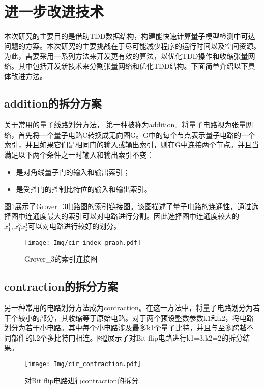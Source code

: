 \section{进一步改进技术}
本次研究的主要目的是借助TDD数据结构，构建能快速计算量子模型检测中可达问题的方案。本次研究的主要挑战在于尽可能减少程序的运行时间以及空间资源。为此，需要采用一系列方法来开发更有效的算法，以优化TDD操作和收缩张量网络。其中包括开发新技术来分割张量网络和优化TDD结构。下面简单介绍以下具体改进方法。

\subsection*{addition的拆分方案}
\label{addition}关于常用的量子线路划分方法，
第一种被称为addition\citep{chen2018classical}。将量子电路视为张量网络，首先将一个量子电路C转换成无向图G。G中的每个节点表示量子电路的一个索引，并且如果它们是相同门的输入或输出索引，则在G中连接两个节点。并且当满足以下两个条件之一时输入和输出索引不变：
\begin{itemize}
	\item 是对角线量子门的输入和输出索引；
	\item 是受控门的控制比特位的输入和输出索引。
\end{itemize}
	
图\ref{fig:addition}展示了Grover\_3电路图的索引链接图。该图描述了量子电路的连通性，通过选择图中连通度最大的索引可以对电路进行分割。因此选择图中连通度较大的$x_1^1,x_1^3x_2^1$可以对电路进行较好的划分。
 
\begin{figure}[!htbp]
	\centering
	\texttt{[image: Img/cir\_index\_graph.pdf]}
	\caption{Grover\_3的索引连接图}
	\label{fig:addition}
\end{figure} 

\subsection*{contraction的拆分方案}
另一种常用的电路划分方法成为contraction。在这一方法中，将量子电路划分为若干个较小的部分，其收缩等于原始电路。对于两个预设整数参数k1和k2，将电路划分为若干小电路。其中每个小电路涉及最多k1个量子比特，并且与至多跨越不同部件的k2个多比特门相连。图\ref{fig:contraction}展示了对Bit flip电路进行k1=3,k2=2的拆分结果。
\begin{figure}[!htbp]
	\centering
	\texttt{[image: Img/cir\_contraction.pdf]}
	\caption{对Bit flip电路进行contraction的拆分}
	\label{fig:contraction}
\end{figure} 


